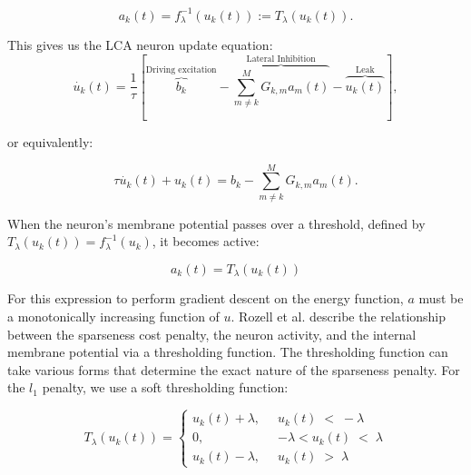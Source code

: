 \begin{displaymath}\label{eq:ch2_a_fu_thresh}
    a_{k}(t) = f_{\lambda}^{-1}(u_{k}(t)) := T_{\lambda}(u_{k}(t)).
\end{displaymath}

This gives us the LCA neuron update equation:
\begin{equation}\label{eq:ch2_u_dot_full}
    \dot{u_{k}}(t) = \frac{1}{\tau} \left[\overbrace{b_{k}}^\text{Driving excitation} - \overbrace{\sum_{m \neq k}^{M}G_{k,m}a_{m}(t)}^\text{Lateral Inhibition} - \overbrace{u_{k}(t)}^\text{Leak} \right],
\end{equation}

\noindent or equivalently:

\begin{displaymath}
    \tau \dot{u_{k}}(t) + u_{k}(t) =  b_{k} - \sum_{m \neq k}^{M}G_{k,m}a_{m}(t).
\end{displaymath}

When the neuron's membrane potential passes over a threshold, defined by $T_{\lambda}(u_{k}(t)) = f_{\lambda}^{-1}(u_{k})$, it becomes active:

\begin{equation}\label{eq:ch2_a_thresh}
  a_{k}(t) = T_{\lambda}(u_{k}(t))
\end{equation}

For this expression to perform gradient descent on the energy function, $a$ must be a monotonically increasing function of $u$. Rozell et al. \citeyearpar{rozell2008sparse} describe the relationship between the sparseness cost penalty, the neuron activity, and the internal membrane potential via a thresholding function. The thresholding function can take various forms that determine the exact nature of the sparseness penalty. For the $l_{1}$ penalty, we use a soft thresholding function:

\begin{equation}\label{eq:ch2_lca_threshold_func}
    T_{\lambda}(u_{k}(t)) = \left\{
    \begin{aligned}
        u_{k}(t)+\lambda,\;\; &u_{k}(t)\; <\; -\lambda \\
        0,\;\; &-\lambda < u_{k}(t)\; <\; \lambda \\
        u_{k}(t)-\lambda,\;\; &u_{k}(t)\; >\; \lambda
    \end{aligned}
    \right.
\end{equation}

